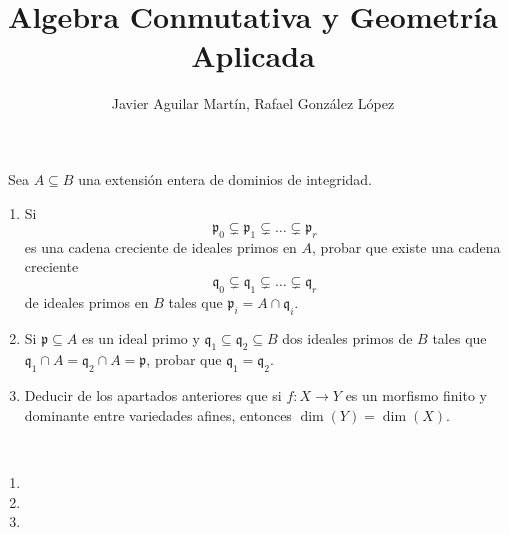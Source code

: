 \documentclass[twoside]{article}
\begin{document}
\title{Algebra Conmutativa y Geometría Aplicada}
\author{Javier Aguilar Martín, Rafael González López}
\maketitle

\begin{ejercicio}{3}\
Sea $A \subseteq B$ una extensión entera de dominios de integridad.
 
\begin{enumerate}
\item Si
$$\mathfrak{p}_0 \subsetneq \mathfrak{p}_1 \subsetneq \dots \subsetneq \mathfrak{p}_r$$
es una cadena creciente de ideales primos en $A$, probar que existe una
cadena creciente
$$\mathfrak{q}_0 \subsetneq \mathfrak{q}_1 \subsetneq \dots \subsetneq \mathfrak{q}_r$$
de ideales primos en $B$ tales que $\mathfrak{p}_i = A \cap \mathfrak{q}_i$.
\item Si $\mathfrak{p} \subseteq A$ es un ideal primo y $\mathfrak{q}_1 \subseteq \mathfrak{q}_2 \subseteq B$ dos ideales primos de $B$ tales
que $\mathfrak{q}_1 \cap A = \mathfrak{q}_2 \cap A = \mathfrak{p}$, probar que $\mathfrak{q}_1 = \mathfrak{q}_2$.
\item Deducir de los apartados anteriores que si $f : X \to Y$ es un morfismo
finito y dominante entre variedades afines, entonces $\dim(Y ) = \dim(X)$.

\end{enumerate}
\end{ejercicio}
\begin{solucion}\

\begin{enumerate}
\item
\item
\item
\end{enumerate}
\end{solucion}
\end{document}
